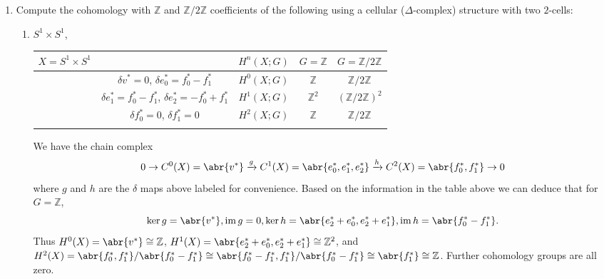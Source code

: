 \documentclass[11pt]{article}
\DeclareMathOperator{\im}{im}
\begin{document}
\begin{enumerate}
    \item Compute the cohomology with $\mathbb{Z}$ and $\mathbb{Z}/2\mathbb{Z}$ coefficients of the following using a
    cellular ($\Delta$-complex) structure with two $2$-cells: \begin{enumerate}
      \item $S^1 \times S^1$,
      \begin{table}[h]
        \centering
        \begin{tabular}{cc|c|c|c}
          $X = S^1 \times S^1$\hspace*{3cm} & \hspace*{5cm} & $H^n(X;G)$ & $G = \mathbb{Z}$ & $G = \mathbb{Z}/2\mathbb{Z}$  \\ \hline
         & $\delta v^\ast = 0$, $\delta e_0^\ast = f_0^\ast - f_1^\ast$ & $H^0(X;G)$ & $\mathbb{Z}$ & $\mathbb{Z}/2\mathbb{Z}$  \\
         & $\delta e_1^\ast= f_0^\ast-f_1^\ast$, $\delta e_2^\ast= -f_0^\ast+f_1^\ast$ & $H^1(X;G)$ & $\mathbb{Z}^2$ & $(\mathbb{Z}/2\mathbb{Z})^2$  \\
         & $\delta f_0^\ast= 0$, $\delta f_1^\ast= 0$ & $H^2(X;G)$ & $\mathbb{Z}$ & $\mathbb{Z}/2\mathbb{Z}$ \\
         &
        \end{tabular}
        \end{table}

        We have the chain complex \[0\to C^0(X) = \abr{v^\ast}\xrightarrow{g}C^1(X) = \abr{e_0^\ast, e_1^\ast, e_2^\ast}\xrightarrow{h}C^2(X) =\abr{f_0^\ast, f_1^\ast}\to 0\] where $g$ and $h$ are the $\delta$ maps above labeled for convenience.
        Based on the information in the table above we can deduce that for $G =\mathbb{Z}$, \[\ker g = \abr{v^\ast}, \im g = 0, \ker h = \abr{e_2^\ast+e_0^\ast,e_2^\ast+e_1^\ast}, \im h = \abr{f_0^\ast-f_1^\ast}.\] Thus $H^0(X) = \abr{v^\ast}\cong \mathbb{Z}$, $H^1(X) = \abr{e_2^\ast+e_0^\ast,e_2^\ast+e_1^\ast} \cong \mathbb{Z}^2$, and $H^2(X) = \abr{f_0^\ast, f_1^\ast}/\abr{f_0^\ast-f_1^\ast} \cong \abr{f_0^\ast-f_1^\ast, f_1^\ast}/\abr{f_0^\ast-f_1^\ast}\cong \abr{f_1^\ast}\cong \mathbb{Z}$. Further cohomology groups are all zero.
        

\end{enumerate}
\end{enumerate}
\end{document}

